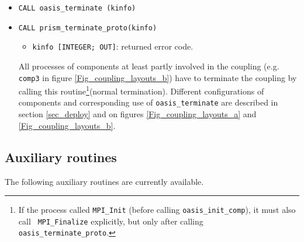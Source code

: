 \begin{itemize}

\item {\tt CALL oasis\_terminate (kinfo)}
\item {\tt CALL prism\_terminate\_proto(kinfo)}
  \begin{itemize}
  \item {\tt kinfo [INTEGER; OUT]}: returned error code.
  \end{itemize}
All processes of components at least partly involved in the coupling (e.g. {\tt comp3} in figure
    \ref{Fig_coupling_layouts_b}) have to terminate the coupling by
  calling this routine\footnote{If the process called {\tt MPI\_Init}
    (before calling {\tt oasis\_init\_comp}), it must also call {\tt
      MPI\_Finalize} explicitly, but only after calling {\tt
      oasis\_terminate\_proto}.}(normal termination). Different configurations of components and corresponding use of {\tt oasis\_terminate} are described in section \ref{sec_deploy} and on figures \ref{Fig_coupling_layouts_a} and \ref{Fig_coupling_layouts_b}.

  

\end{itemize}


\subsection{Auxiliary routines}
\label{subsubsec_auxroutines}

The following auxiliary routines are currently available.

